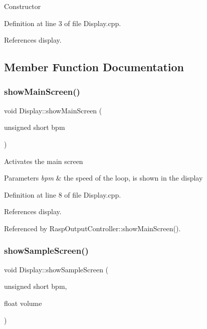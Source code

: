 Constructor 

Definition at line 3 of file Display.\+cpp.



References display.



\subsection{Member Function Documentation}
\mbox{\label{class_display_aae248dcbc4c44b911c35918feacaf31a}} 
\subsubsection{\texorpdfstring{show\+Main\+Screen()}{showMainScreen()}}
{\footnotesize\ttfamily void Display\+::show\+Main\+Screen (\begin{DoxyParamCaption}\item[{unsigned short}]{bpm }\end{DoxyParamCaption})}

Activates the main screen 
\begin{DoxyParams}{Parameters}
{\em bpm} & the speed of the loop, is shown in the display \\
\hline
\end{DoxyParams}


Definition at line 8 of file Display.\+cpp.



References display.



Referenced by Rasp\+Output\+Controller\+::show\+Main\+Screen().

\mbox{\label{class_display_ae00838dd994556524fb8d86d7e855770}} 
\subsubsection{\texorpdfstring{show\+Sample\+Screen()}{showSampleScreen()}}
{\footnotesize\ttfamily void Display\+::show\+Sample\+Screen (\begin{DoxyParamCaption}\item[{unsigned short}]{bpm,  }\item[{float}]{volume }\end{DoxyParamCaption})}

